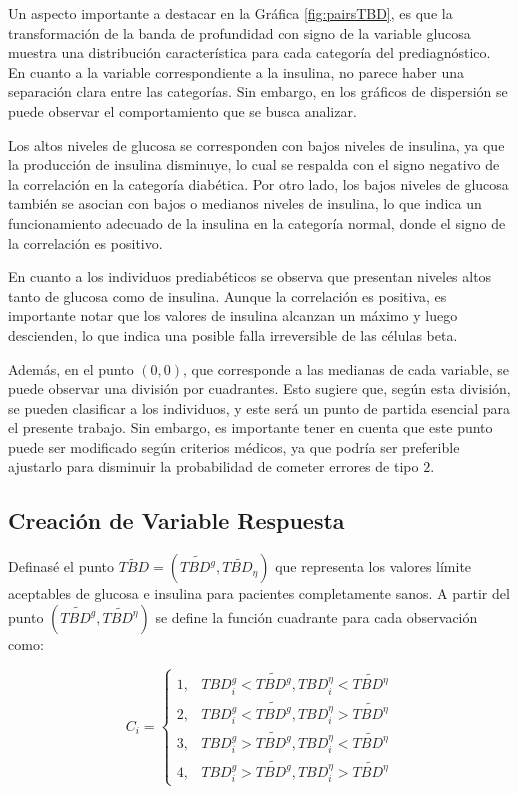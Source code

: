 Un aspecto importante a destacar en la Gráfica \ref{fig:pairsTBD}, es que la transformación de la banda de profundidad con signo de la variable glucosa muestra una distribución característica para cada categoría del prediagnóstico. En cuanto a la variable correspondiente a la insulina, no parece haber una separación clara entre las categorías. Sin embargo, en los gráficos de dispersión se puede observar el comportamiento que se busca analizar.

Los altos niveles de glucosa se corresponden con bajos niveles de insulina, ya que la producción de insulina disminuye, lo cual se respalda con el signo negativo de la correlación en la categoría diabética. Por otro lado, los bajos niveles de glucosa también se asocian con bajos o medianos niveles de insulina, lo que indica un funcionamiento adecuado de la insulina en la categoría normal, donde el signo de la correlación es positivo.

En cuanto a los individuos prediabéticos se observa que presentan niveles altos tanto de glucosa como de insulina. Aunque la correlación es positiva, es importante notar que los valores de insulina alcanzan un máximo y luego descienden, lo que indica una posible falla irreversible de las células beta.

Además, en el punto $(0, 0)$, que corresponde a las medianas de cada variable, se puede observar una división por cuadrantes. Esto sugiere que, según esta división, se pueden clasificar a los individuos, y este será un punto de partida esencial para el presente trabajo. Sin embargo, es importante tener en cuenta que este punto puede ser modificado según criterios médicos, ya que podría ser preferible ajustarlo para disminuir la probabilidad de cometer errores de tipo $2$.

\subsection{Creación de Variable Respuesta}

Definasé el punto $\widetilde{TBD} = (\widetilde{TBD^g}, \widetilde{TBD_{\eta}})$ que representa los valores límite aceptables de glucosa e insulina para pacientes completamente sanos. A partir del punto $(\widetilde{TBD^g},\widetilde{TBD^{\eta}})$ se define la función cuadrante para cada observación como:

\begin{equation}
     C_ i = \left\{\begin{matrix}
1, & TBD_{i}^{g} < \widetilde{TBD^{g}}, TBD_{i}^{\eta} < \widetilde{TBD^{\eta}}\\
2, & TBD_{i}^{g} < \widetilde{TBD^{g}}, TBD_{i}^{\eta} > \widetilde{TBD^{\eta}}\\
3, & TBD_{i}^{g} > \widetilde{TBD^{g}}, TBD_{i}^{\eta} < \widetilde{TBD^{\eta}}\\
4, & TBD_{i}^{g} > \widetilde{TBD^{g}}, TBD_{i}^{\eta} > \widetilde{TBD^{\eta}}
\end{matrix}\right.
\end{equation}

